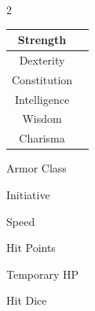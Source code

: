 \documentclass[11pt,letterpaper]{article}
\begin{document}
\begin{multicols}{2}


\begin{tcolorbox}[sheetbox,title=Attributes]

\begin{tabular}{|c|c|}
\hline
Strength & \\[1cm]\hline
Dexterity & \\[1cm]\hline
Constitution & \\[1cm]\hline
Intelligence & \\[1cm]\hline
Wisdom & \\[1cm]\hline
Charisma & \\[1cm]\hline
\end{tabular}

\end{tcolorbox}


\begin{tcolorbox}[sheetbox,title=Combat]

Armor Class

\vspace{1cm}

Initiative

\vspace{1cm}

Speed

\vspace{1cm}

Hit Points

\vspace{1.5cm}

Temporary HP

\vspace{1cm}

Hit Dice

\vspace{1cm}

\end{tcolorbox}


\begin{tcolorbox}[sheetbox,title=Skills]

\begin{tabular}{ll}


\end{tabular}
\end{tcolorbox}
\end{multicols}
\end{document}
